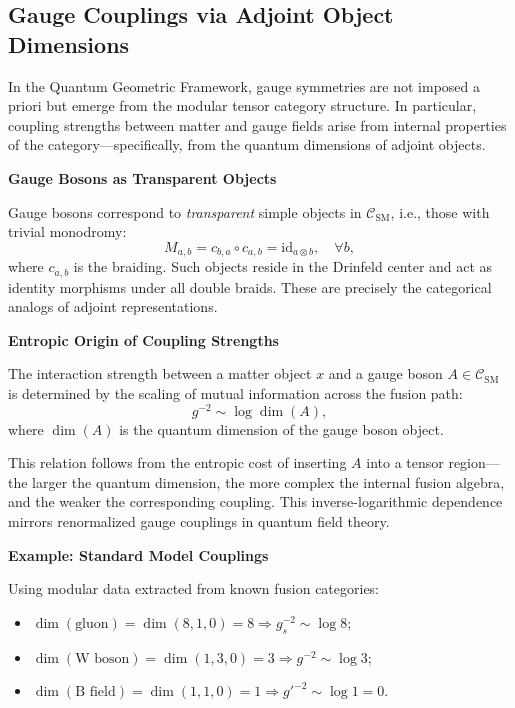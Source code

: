 \documentclass[11pt]{article}
\begin{document}
\subsection{Gauge Couplings via Adjoint Object Dimensions}

In the Quantum Geometric Framework, gauge symmetries are not imposed a priori but emerge from the modular tensor category structure. In particular, coupling strengths between matter and gauge fields arise from internal properties of the category—specifically, from the quantum dimensions of adjoint objects.

\vspace{0.5em}
\noindent\textbf{Gauge Bosons as Transparent Objects}

Gauge bosons correspond to \emph{transparent} simple objects in \( \mathcal{C}_{\text{SM}} \), i.e., those with trivial monodromy:
\[
M_{a,b} = c_{b,a} \circ c_{a,b} = \text{id}_{a \otimes b}, \quad \forall b,
\]
where \( c_{a,b} \) is the braiding. Such objects reside in the Drinfeld center and act as identity morphisms under all double braids. These are precisely the categorical analogs of adjoint representations.

\vspace{0.5em}
\noindent\textbf{Entropic Origin of Coupling Strengths}

The interaction strength between a matter object \( x \) and a gauge boson \( A \in \mathcal{C}_{\text{SM}} \) is determined by the scaling of mutual information across the fusion path:
\[
g^{-2} \sim \log \dim(A),
\]
where \( \dim(A) \) is the quantum dimension of the gauge boson object.

This relation follows from the entropic cost of inserting \( A \) into a tensor region—the larger the quantum dimension, the more complex the internal fusion algebra, and the weaker the corresponding coupling. This inverse-logarithmic dependence mirrors renormalized gauge couplings in quantum field theory.

\vspace{0.5em}
\noindent\textbf{Example: Standard Model Couplings}

Using modular data extracted from known fusion categories:
\begin{itemize}
  \item \( \dim(\text{gluon}) = \dim(8,1,0) = 8 \Rightarrow g_s^{-2} \sim \log 8 \);
  \item \( \dim(\text{W boson}) = \dim(1,3,0) = 3 \Rightarrow g^{-2} \sim \log 3 \);
  \item \( \dim(\text{B field}) = \dim(1,1,0) = 1 \Rightarrow g'^{-2} \sim \log 1 = 0 \).
\end{itemize}
\end{document}
